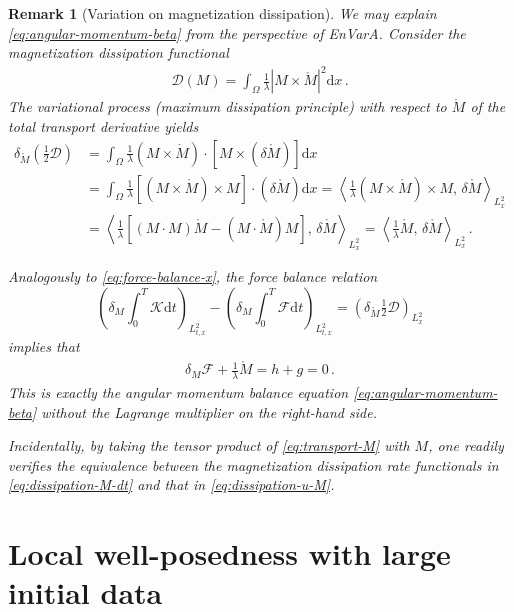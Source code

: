 \documentclass[reqno,11pt]{amsart}
\newtheorem{remark}{Remark}[section]
\numberwithin{equation}{section}
\def\d{\mathrm{d}}
\def\no{\nonumber}
\newcommand{\skpa}[2]{\left\langle #1,\, #2 \right\rangle}
\begin{document}
\begin{remark}[Variation on magnetization dissipation]\label{Rmk-2.1}
  We may explain \eqref{eq:angular-momentum-beta} from the perspective of EnVarA.  Consider the magnetization dissipation functional
  \begin{align}\label{eq:dissipation-M-dt}
    \mathcal{D}(M) = \int_{\Omega} \tfrac{1}{\lambda} |M \times \mathring{M}|^2 \d x \,.
  \end{align}
The variational process (maximum dissipation principle) with respect to \(\mathring{M}\) of the total transport derivative yields
  \begin{align}
    \delta_{\mathring{M}} (\tfrac{1}{2}\mathcal{D}) 
    & = \int_{\Omega} \tfrac{1}{\lambda} (M \times \mathring{M}) \cdot [M \times (\delta \mathring{M})] \d x 
    \\\no & 
    = \int_{\Omega} \tfrac{1}{\lambda} [(M \times \mathring{M}) \times M] \cdot (\delta \mathring{M}) \d x
    = \skpa{ \tfrac{1}{\lambda} (M \times \mathring{M}) \times M }{\delta \mathring{M}}_{L^2_{x}} 
    \\\no & 
    = \skpa{ \tfrac{1}{\lambda} [(M \cdot M) \mathring{M} - (M \cdot \mathring{M}) M] }{\delta \mathring{M}}_{L^2_{x}} 
    = \skpa{ \tfrac{1}{\lambda} \mathring{M} }{\delta \mathring{M}}_{L^2_{x}} \,.
  \end{align}

Analogously to \eqref{eq:force-balance-x}, the force balance relation
$$ \left( \delta_M \int_0^T \mathcal{K} \d t \right)_{L^2_{t,x }} - \left( \delta_M \int_0^T \mathcal{F} \d t \right)_{L^2_{t,x }} = \left( \delta_{\mathring{M}} \tfrac{1}{2}\mathcal{D} \right)_{L^2_{x }}$$ 
implies that
\begin{align}
  \delta_M \mathcal{F} + \tfrac{1}{\lambda} \mathring{M} = h + g = 0 \,.
\end{align}
This is exactly the angular momentum balance equation \eqref{eq:angular-momentum-beta} without the Lagrange multiplier on the right-hand side.

Incidentally, by taking the tensor product of \eqref{eq:transport-M} with \(M\), one readily verifies the equivalence between the magnetization dissipation rate functionals in \eqref{eq:dissipation-M-dt} and that in \eqref{eq:dissipation-u-M}.
\end{remark}


\section{Local well-posedness with large initial data} \label{Sec:3}
\end{document}
